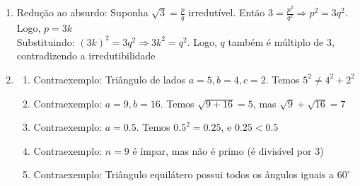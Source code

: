 \begin{enumerate}
    \item
      Redução ao absurdo: Suponha $\sqrt{3} = \frac{p}{q}$ irredutível.
      Então $3 = \frac{p^2}{q^2} \Rightarrow p^2 = 3q^2$.
      Logo, $p = 3k$ \\
      Substituindo: $(3k)^2 = 3q^2 \Rightarrow 3k^2 = q^2$.
      Logo, $q$ também é múltiplo de 3, contradizendo a irredutibilidade

    \item
    \begin{enumerate}

        \item Contraexemplo: Triângulo de lados $a=5, b=4, c=2$.
          Temos $5^2 \neq 4^2 + 2^2$

        \item Contraexemplo: $a=9, b=16$.
          Temos $\sqrt{9+16}=5$, mas $\sqrt{9}+\sqrt{16}=7$

        \item Contraexemplo: $a=0.5$.
          Temos $0.5^2 = 0.25$, e $0.25 < 0.5$

        \item Contraexemplo: $n=9$ é ímpar,
          mas não é primo (é divisível por 3)

        \item Contraexemplo: Triângulo equilátero possui todos os
          ângulos iguais a $60^\circ$

    \end{enumerate}
\end{enumerate}
